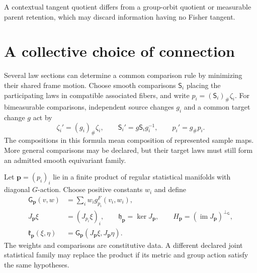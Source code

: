 A contextual tangent quotient differs from a group-orbit quotient or measurable parent retention, which may discard information having no Fisher tangent.

\section{A collective choice of connection}

Several law sections can determine a common comparison rule by minimizing their shared frame motion. Choose smooth comparisons $\mathsf S_i$ placing the participating laws in compatible associated fibers, and write $p_i=(\mathsf S_i)_\#\zeta_i$. For bimeasurable comparisons, independent source changes $g_i$ and a common target change $g$ act by
\begin{equation}
\zeta_i'=(g_i)_\#\zeta_i,\qquad
\mathsf S_i'=g\mathsf S_i g_i^{-1},\qquad
p_i'=g_\#p_i.
\label{geo:comparison-data}
\end{equation}
The compositions in this formula mean composition of represented sample maps. More general comparisons may be declared, but their target laws must still form an admitted smooth equivariant family.

Let $\boldsymbol p=(p_i)_i$ lie in a finite product of regular statistical manifolds with diagonal $G$-action. Choose positive constants $w_i$ and define
\begin{align}
\mathsf G_{\boldsymbol p}(v,w)&=\sum_i w_i g^F_{p_i}(v_i,w_i),\\
J_{\boldsymbol p}\xi&=(J_{p_i}\xi)_i,\qquad
\mathfrak h_{\boldsymbol p}=\ker J_{\boldsymbol p},\qquad
H_{\boldsymbol p}=(\operatorname{im}J_{\boldsymbol p})^{\perp_{\mathsf G}},\\
\mathfrak k_{\boldsymbol p}(\xi,\eta)
&=\mathsf G_{\boldsymbol p}(J_{\boldsymbol p}\xi,J_{\boldsymbol p}\eta).
\label{geo:locked-inertia}
\end{align}
The weights and comparisons are constitutive data. A different declared joint statistical family may replace the product if its metric and group action satisfy the same hypotheses.

